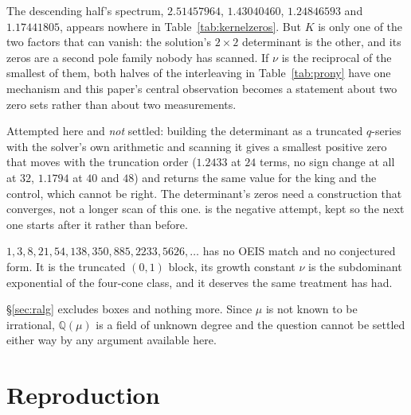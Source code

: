 \documentclass[11pt]{article}
\newcommand{\Q}{\mathbb{Q}}
\begin{document}
\begin{openproblem}
\label{op:det}
The descending half's spectrum, $2.51457964$, $1.43040460$, $1.24846593$ and
$1.17441805$, appears nowhere in Table~\ref{tab:kernelzeros}. But $K$ is only
one of the two factors that can vanish: the solution's $2\times2$ determinant is
the other, and its zeros are a second pole family nobody has scanned. If $\nu$
is the reciprocal of the smallest of them, both halves of the interleaving in
Table~\ref{tab:prony} have one mechanism and this paper's central observation
becomes a statement about two zero sets rather than about two measurements.

Attempted here and \emph{not} settled: building the determinant as a truncated
$q$-series with the solver's own arithmetic and scanning it gives a smallest
positive zero that moves with the truncation order ($1.2433$ at $24$ terms,
no sign change at all at $32$, $1.1794$ at $40$ and $48$) and returns the
same value for the king and the control, which cannot be right. The
determinant's zeros need a construction that converges, not a longer scan of
this one.  is the negative attempt,
kept so the next one starts after it rather than before.
\end{openproblem}

\begin{openproblem}
$1, 3, 8, 21, 54, 138, 350, 885, 2233, 5626, \dots$ has no OEIS match and no
conjectured form. It is the truncated $(0,1)$ block, its growth constant $\nu$
is the subdominant exponential of the four-cone class, and it deserves the same
treatment  has had.
\end{openproblem}

\begin{openproblem}[is $r$ algebraic over $\Q(\mu)$?]
\S\ref{sec:ralg} excludes boxes and nothing more. Since $\mu$ is not known to be
irrational, $\Q(\mu)$ is a field of unknown degree and the question cannot be
settled either way by any argument available here.
\end{openproblem}

\section{Reproduction}
\label{sec:repro}
\end{document}
